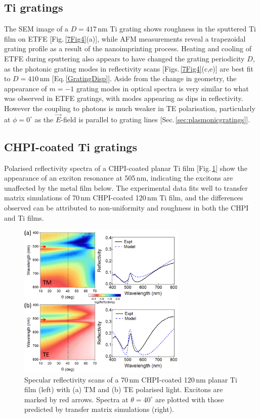 \subsection{Ti gratings}
The SEM image of a $D=417$\,nm Ti grating shows roughness in the sputtered Ti film on ETFE [Fig.\,\ref{7Fig4}(a)], while AFM measurements reveal a trapezoidal grating profile as a result of the nanoimprinting process. Heating and cooling of ETFE during sputtering also appears to have changed the grating periodicity $D$, as the photonic grating modes in reflectivity scans [Figs.\,\ref{7Fig4}(c,e)] are best fit to $D=410$\,nm [Eq.\,\ref{GratingDisp}]. Aside from the change in geometry, the appearance of $m=-1$ grating modes in optical spectra is very similar to what was observed in ETFE gratings, with modes appearing as dips in reflectivity. However the coupling to photons is much weaker in TE polarisation, particularly at $\phi=0^{\circ}$ as the $\vec{E}$-field is parallel to grating lines [Sec.\,\ref{sec:plasmonicgratings}].



\subsection{CHPI-coated Ti gratings}
Polarised reflectivity spectra of a CHPI-coated planar Ti film [Fig.\,\ref{7Fig5}] show the appearance of an exciton resonance at 505\,nm, indicating the excitons are unaffected by the metal film below. The experimental data fits well to transfer matrix simulations \cite{Born1999} of 70\,nm CHPI-coated 120\,nm Ti film, and the differences observed can be attributed to non-uniformity and roughness in both the CHPI and Ti films.
\begin{figure}[h!] 
\centering    
\includegraphics[width=0.72\textwidth]{Fig5}
\caption[(a) TM and (b) TE polarised reflectivity scans of 70\,nm CHPI film on 120\,nm planar Ti film compared to transfer matrix simulations.]{Specular reflectivity scans of a 70\,nm CHPI-coated 120\,nm planar Ti film (left) with (a) TM and (b) TE polarised light. Excitons are marked by red arrows. Spectra at $\theta=40^{\circ}$ are plotted with those predicted by transfer matrix simulations (right).}
\label{7Fig5}
\end{figure}

